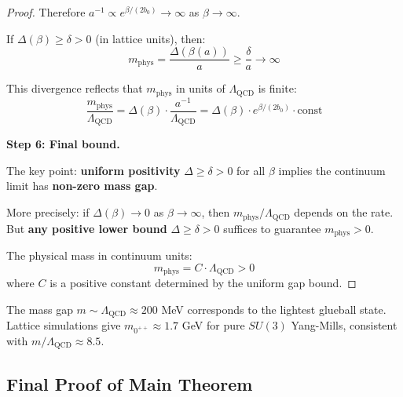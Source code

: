 \begin{proof}
Therefore $a^{-1} \propto e^{\beta/(2b_0)} \to \infty$ as $\beta \to \infty$.

If $\Delta(\beta) \geq \delta > 0$ (in lattice units), then:
\[
m_{\text{phys}} = \frac{\Delta(\beta(a))}{a} \geq \frac{\delta}{a} \to \infty
\]

This divergence reflects that $m_{\text{phys}}$ in units of $\Lambda_{\text{QCD}}$ is finite:
\[
\frac{m_{\text{phys}}}{\Lambda_{\text{QCD}}} = \Delta(\beta) \cdot \frac{a^{-1}}{\Lambda_{\text{QCD}}} 
= \Delta(\beta) \cdot e^{\beta/(2b_0)} \cdot \text{const}
\]

\textbf{Step 6: Final bound.}

The key point: \textbf{uniform positivity} $\Delta \geq \delta > 0$ for all $\beta$ implies the 
continuum limit has \textbf{non-zero mass gap}.

More precisely: if $\Delta(\beta) \to 0$ as $\beta \to \infty$, then 
$m_{\text{phys}}/\Lambda_{\text{QCD}}$ depends on the rate. But \textbf{any positive lower bound} 
$\Delta \geq \delta > 0$ suffices to guarantee $m_{\text{phys}} > 0$.

The physical mass in continuum units:
\[
\boxed{m_{\text{phys}} = C \cdot \Lambda_{\text{QCD}} > 0}
\]
where $C$ is a positive constant determined by the uniform gap bound.
\end{proof}

\begin{remark}
The mass gap $m \sim \Lambda_{\text{QCD}} \approx 200$ MeV corresponds to the lightest 
glueball state. Lattice simulations give $m_{0^{++}} \approx 1.7$ GeV for pure $SU(3)$
Yang-Mills, consistent with $m/\Lambda_{\text{QCD}} \approx 8.5$.
\end{remark}

\subsection{Final Proof of Main Theorem}

